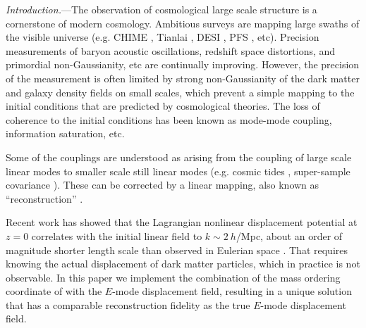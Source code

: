 \documentclass[aps,prl,twocolumn,showpacs,superscriptaddress,groupedaddress,nofootinbib]{revtex4}  %
\begin{document}
\pacs{}
\maketitle


{\it Introduction.}---The observation of cosmological large scale structure 
is a cornerstone of modern cosmology.  
Ambitious surveys are mapping large swaths of the
visible universe (e.g. CHIME \cite{chime}, Tianlai \cite{tianlai}, DESI \cite{desi}, PFS \cite{pfs}, etc).  
Precision measurements of baryon acoustic oscillations, 
redshift space distortions, and primordial non-Gaussianity, etc
are continually improving.
However, the precision of the measurement is often limited by strong non-Gaussianity
of the dark matter and galaxy density fields on small scales, which prevent 
a simple mapping to the
initial conditions that are predicted by cosmological theories.  The
loss of coherence to the initial conditions has been known as
mode-mode coupling, information saturation, etc.

Some of the couplings are understood as arising from the coupling of
large scale linear modes to smaller scale still linear modes
(e.g. cosmic tides \cite{2012tides1,2016tides2,2016tides3}, super-sample covariance \cite{2013sc1,2014sc2,2014sc3}).  These can be corrected by a
linear mapping, also known as ``reconstruction'' \cite{2007bao}.

Recent work has showed that the Lagrangian nonlinear
displacement potential at $z=0$ correlates with the initial linear field 
to $k\sim 2\ h$/Mpc, about an order of magnitude shorter
length scale than observed in Eulerian space \cite{2016yu}.  That requires
knowing the actual displacement of dark matter particles, which in
practice is not observable.  In this paper we implement the
combination of the mass ordering coordinate of \cite{2016arXiv160907041Z} with the
$E$-mode displacement field, resulting in a unique solution that has a
comparable reconstruction fidelity as the true $E$-mode displacement field.
\end{document}
